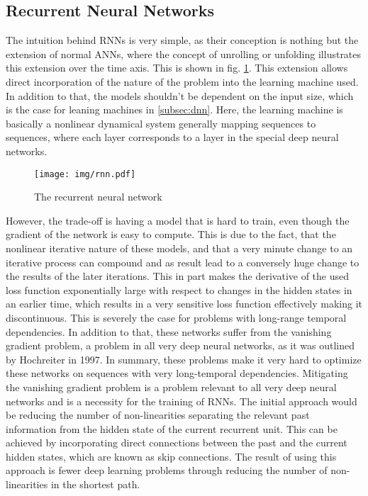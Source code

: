 \subsection{Recurrent Neural Networks}
The intuition behind RNNs is very simple, as their conception is nothing but the extension of normal ANNs, where the concept of unrolling or unfolding illustrates this extension over the time axis. This is shown in fig. \ref{fig:rnn}. This extension allows direct incorporation of the nature of the problem into the learning machine used. In addition to that, the models shouldn't be dependent on the input size, which is the case for leaning machines in \ref{subsec:dnn}. Here, the learning machine is basically a nonlinear dynamical system generally mapping sequences to sequences, where each layer corresponds to a layer in the special deep neural networks.\newline
\begin{figure}[H]
	\centering
	\texttt{[image: img/rnn.pdf]}
	\caption{The recurrent neural network}
	\label{fig:rnn}
\end{figure}
However, the trade-off is having a model that is hard to train, even though the gradient of the network is easy to compute. This is due to the fact, that the nonlinear iterative nature of these models, and that a very minute change to an iterative process can compound and as result lead to a conversely huge change to the results of the later iterations. This in part makes the derivative of the used loss function exponentially large with respect to changes in the hidden states in an earlier time, which results in a very sensitive loss function effectively making it discontinuous. This is severely the case for problems with long-range temporal dependencies\cite{sutskever2013training}. In addition to that, these networks suffer from the vanishing gradient problem, a problem in all very deep neural networks, as it was outlined by Hochreiter in 1997\cite{hochreiter1997long}. In summary, these problems make it very hard to optimize these networks on sequences with very long-temporal dependencies.\newline
Mitigating the vanishing gradient problem is a problem relevant to all very deep neural networks and is a necessity for the training of RNNs. The initial approach would be reducing the number of non-linearities separating the relevant past information from the hidden state of the current recurrent unit. This can be achieved by incorporating direct connections between the past and the current hidden states, which are known as skip connections. The result of using this approach is fewer deep learning problems through reducing the number of non-linearities in the shortest path\cite{hochreiter1997long}.\newline

